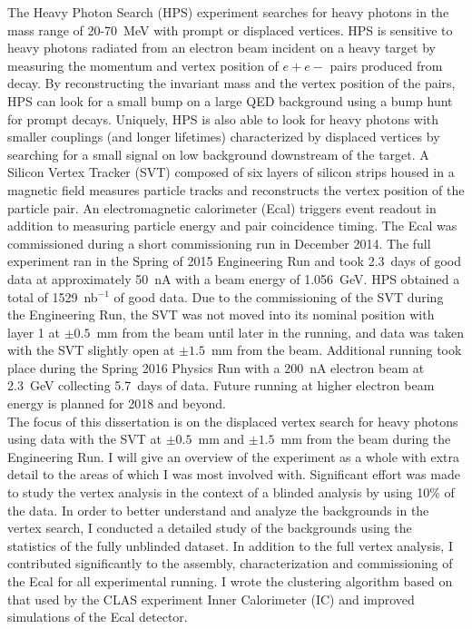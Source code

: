 The Heavy Photon Search (HPS) experiment searches for heavy photons in the mass range of 20-70~MeV with prompt or displaced vertices. HPS is sensitive to heavy photons radiated from an electron beam incident on a heavy target by measuring the momentum and vertex position of $e+e-$ pairs produced from decay. By reconstructing the invariant mass and the vertex position of the pairs, HPS can look for a small bump on a large QED background using a bump hunt for prompt decays. Uniquely, HPS is also able to look for heavy photons with smaller couplings (and longer lifetimes) characterized by displaced vertices by searching for a small signal on low background downstream of the target. A Silicon Vertex Tracker (SVT) composed of six layers of silicon strips housed in a magnetic field measures particle tracks and reconstructs the vertex position of the particle pair. An electromagnetic calorimeter (Ecal) triggers event readout in addition to measuring particle energy and pair coincidence timing. The Ecal was commissioned during a short commissioning run in December 2014. The full experiment ran in the Spring of 2015 Engineering Run and took 2.3~days of good data at approximately 50~nA with a beam energy of 1.056~GeV. HPS obtained a total of 1529~nb$^{-1}$ of good data. Due to the commissioning of the SVT during the Engineering Run, the SVT was not moved into its nominal position with layer 1 at $\pm0.5$~mm from the beam until later in the running, and data was taken with the SVT slightly open at $\pm1.5$~mm from the beam.  Additional running took place during the Spring 2016 Physics Run with a 200~nA electron beam at 2.3~GeV collecting 5.7~days of data.  Future running at higher electron beam energy is planned for 2018 and beyond.\\
The focus of this dissertation is on the displaced vertex search for heavy photons using data with the SVT at $\pm0.5$~mm and $\pm1.5$~mm from the beam during the Engineering Run. I will give an overview of the experiment as a whole with extra detail to the areas of which I was most involved with. Significant effort was made to study the vertex analysis in the context of a blinded analysis by using 10$\%$ of the data. In order to better understand and analyze the backgrounds in the vertex search, I conducted a detailed study of the backgrounds using the statistics of the fully unblinded dataset. In addition to the full vertex analysis, I contributed significantly to the assembly, characterization and commissioning of the Ecal for all experimental running. I wrote the clustering algorithm based on that used by the CLAS experiment Inner Calorimeter (IC) and improved simulations of the Ecal detector. 
